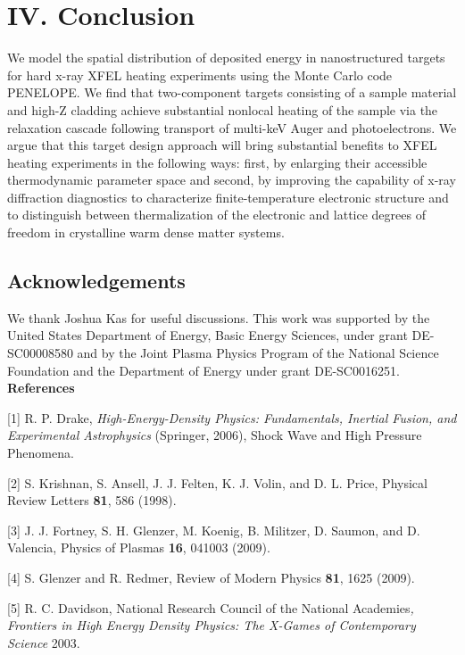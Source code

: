 \section{IV. Conclusion}

We model the spatial distribution of deposited energy in nanostructured
targets for hard x-ray XFEL heating experiments using the Monte Carlo
code PENELOPE. We find that two-component targets consisting of a sample
material and high-Z cladding achieve substantial nonlocal heating of the
sample via the relaxation cascade following transport of multi-keV Auger
and photoelectrons. We argue that this target design approach will bring
substantial benefits to XFEL heating experiments in the following ways:
first, by enlarging their accessible thermodynamic parameter space and
second, by improving the capability of x-ray diffraction diagnostics to
characterize finite-temperature electronic structure and to distinguish
between thermalization of the electronic and lattice degrees of freedom
in crystalline warm dense matter systems.

\subsection{Acknowledgements}

We thank Joshua Kas for useful discussions. This work was supported by
the United States Department of Energy, Basic Energy Sciences, under
grant DE-SC00008580 and by the Joint Plasma Physics Program of the
National Science Foundation and the Department of Energy under grant
DE-SC0016251. \textbf{\\References}

{[}1{]} R. P. Drake, \emph{High-Energy-Density Physics: Fundamentals,
Inertial Fusion, and Experimental Astrophysics} (Springer, 2006), Shock
Wave and High Pressure Phenomena.

{[}2{]} S. Krishnan, S. Ansell, J. J. Felten, K. J. Volin, and D. L.
Price, Physical Review Letters \textbf{81}, 586 (1998).

{[}3{]} J. J. Fortney, S. H. Glenzer, M. Koenig, B. Militzer, D. Saumon,
and D. Valencia, Physics of Plasmas \textbf{16}, 041003 (2009).

{[}4{]} S. Glenzer and R. Redmer, Review of Modern Physics \textbf{81},
1625 (2009).

{[}5{]} R. C. Davidson, National Research Council of the National
Academies\emph{,} \emph{Frontiers in High Energy Density Physics: The
X-Games of Contemporary Science} 2003.

